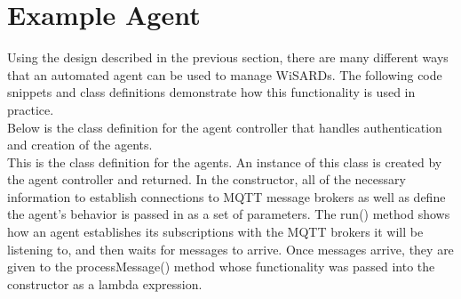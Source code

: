 



\section{Example Agent}
Using the design described in the previous section, there are many different ways that an automated agent can be used to manage WiSARDs. The following code snippets and class definitions demonstrate how this functionality is used in practice.\\

Below is the class definition for the agent controller that handles authentication and creation of the agents.\\

 
 
  This is the class definition for the agents. An instance of this class is created by the agent controller and returned. In the constructor, all of the necessary information to establish connections to MQTT message brokers as well as define the agent's behavior is passed in as a set of parameters. The run() method shows how an agent establishes its subscriptions with the MQTT brokers it will be listening to, and then waits for messages to arrive. Once messages arrive, they are given to the processMessage() method whose functionality was passed into the constructor as a lambda expression.\\
  
